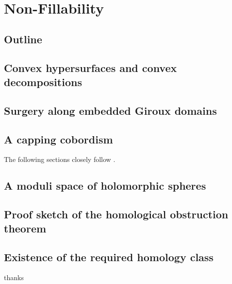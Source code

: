 \documentclass[oneside]{amsbook}
\begin{document}
\chapter{Non-Fillability}\label{chap:nonfillable}
\section{Outline}

\section{Convex hypersurfaces and convex decompositions}\label{sec:convex_decomposition}

\section{Surgery along embedded Giroux domains}

\section{A capping cobordism}
The following sections closely follow \cite[Section 6]{BGM22}.

\section{A moduli space of holomorphic spheres}

\section{Proof sketch of the homological obstruction theorem}\label{sec:proof_hom_obstr}

\section{Existence of the required homology class}\label{sec:homology_class}

\newpage
thanks
\newpage


\end{document}
